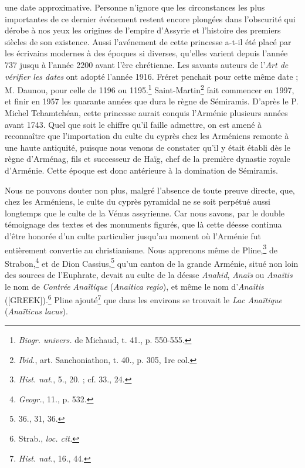 \documentclass[a4paper, 11pt, oneside, polutonikogreek, french]{article}
\begin{document}
une date approximative. Personne n'ignore que les circonstances les plus importantes de ce dernier événement restent encore plongées dans l'obscurité qui dérobe à nos yeux les origines de l'empire d'Assyrie et l'histoire des premiers siècles de son existence. Aussi l'avénement de cette princesse a-t-il été placé par les écrivains modernes à des époques si diverses, qu'elles varient depuis l'année 737 jusqu à l'année 2200 avant l'ère chrétienne. Les savants auteurs de l'\emph{Art de vérifier les dates} ont adopté l'année 1916. Fréret penchait pour cette même date ; M. Daunou, pour celle de 1196 ou 1195.\footnote{\emph{Biogr. univers.} de Michaud, t. 41., p. 550-555.} Saint-Martin\footnote{\emph{Ibid.}, art. Sanchoniathon, t. 40., p. 305, 1re col.} fait commencer en 1997, et finir en 1957 les quarante années que dura le règne de Sémiramis. D'après le P. Michel Tchamtchéan, cette princesse aurait conquis l'Arménie plusieurs années avant 1743. Quel que soit le chiffre qu'il faille admettre, on est amené à reconnaître que l'importation du culte du cyprès chez les Arméniens remonte à une haute antiquité, puisque nous venons de constater qu'il y était établi dès le règne d'Arménag, fils et successeur de Haïg, chef de la première dynastie royale d'Arménie. Cette époque est donc antérieure à la domination de Sémiramis.

Nous ne pouvons douter non plus, malgré l'absence de toute preuve directe, que, chez les Arméniens, le culte du cyprès pyramidal ne se soit perpétué aussi longtemps que le culte de la Vénus assyrienne. Car nous savons, par le double témoignage des textes et des monuments figurés, que là cette déesse continua d'être honorée d'un culte particulier jusqu'au moment où l'Arménie fut entièrement convertie au christianisme. Nous apprenons même de Pline,\footnote{\emph{Hist. nat.}, 5., 20. ; cf. 33., 24.} de Strabon,\footnote{\emph{Geogr.}, 11., p. 532.} et de Dion Cassius,\footnote{36., 31, 36.} qu'un canton de la grande Arménie, situé non loin des sources de l'Euphrate, devait au culte de la déesse \emph{Anahid}, \emph{Anaïs} ou \emph{Anaïtis} le nom de \emph{Contrée Anaïtique} (\emph{Anaitica regio}), et même le nom d'\emph{Anaïtis} ([GREEK]).\footnote{Strab., \emph{loc. cit.}} Pline ajouté\footnote{\emph{Hist. nat.}, 16., 44.} que dans les environs se trouvait le \emph{Lac Anaïtique} (\emph{Anaïticus lacus}).
\end{document}

